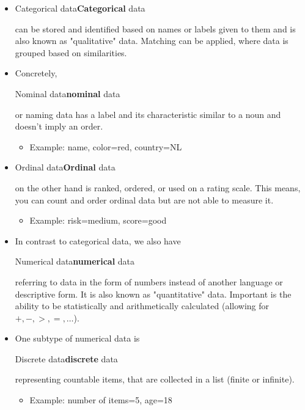 \begin{itemize}
  \item \begin{sidenote}{Categorical data}\textbf{Categorical} data\end{sidenote} can be stored and identified based on names or labels given to them and is also known as "qualitative" data. Matching can be applied, where data is grouped based on similarities.
  
  \item Concretely, \begin{sidenote}{Nominal data}\textbf{nominal} data\end{sidenote} or naming data has a label and its characteristic similar to a noun and doesn't imply an order.
  \begin{itemize}
    \item {\footnotesize\color{ForestGreen}Example: name, color=red, country=NL}
  \end{itemize}
  
  \item \begin{sidenote}{Ordinal data}\textbf{Ordinal} data\end{sidenote} on the other hand is ranked, ordered, or used on a rating scale. This means, you can count and order ordinal data but are not able to measure it.
  \begin{itemize}
    \item {\footnotesize\color{ForestGreen}Example: risk=medium, score=good}
  \end{itemize}
  
  \item In contrast to categorical data, we also have \begin{sidenote}{Numerical data}\textbf{numerical} data\end{sidenote} referring to data in the form of numbers instead of another language or descriptive form. It is also known as "quantitative" data. Important is the ability to be statistically and arithmetically calculated (allowing for $+, -, >, =, \dots$).
  
  \item One subtype of numerical data is \begin{sidenote}{Discrete data}\textbf{discrete} data\end{sidenote} representing countable items, that are collected in a list (finite or infinite).
  \begin{itemize}
    \item {\footnotesize\color{ForestGreen}Example: number of items=5, age=18}
  \end{itemize}
  

\end{itemize}
